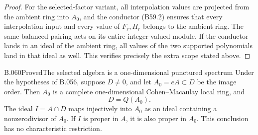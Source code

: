 \begin{proof}
For the selected-factor variant, all interpolation
values are projected from the ambient ring into
$A_0$, and the conductor (B59.2) ensures that
every interpolation input and every value of
$F_r,H_r$ belongs to the ambient ring. The same
balanced pairing acts on its entire integer-valued
module. If the conductor lands in an ideal of
the ambient ring, all values of the two supported
polynomials land in that ideal as well. This
verifies precisely the extra scope stated above.
\end{proof}

\begin{saresult}{B.060}{Proved}{The selected algebra is a one-dimensional punctured spectrum}
Under the hypotheses of B.056, suppose $D\ne0$,
and let $A_0=eA\subset D$ be the image order.
Then $A_0$ is a complete one-dimensional
Cohen--Macaulay local ring, and
\[
                         D=Q(A_0).                       \tag{B60.1}
\]
The ideal $I=A\cap D$ maps injectively into $A_0$
as an ideal containing a nonzerodivisor of $A_0$.
If $I$ is proper in $A$, it is also proper in $A_0$.
This conclusion has no characteristic restriction.
\end{saresult}
